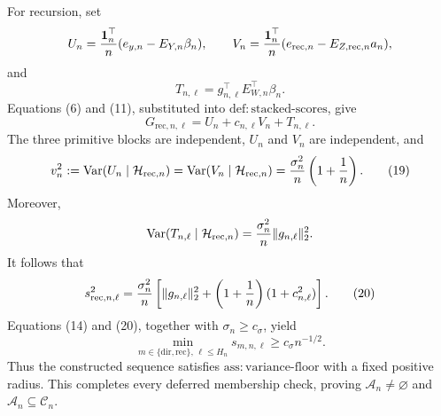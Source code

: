 For recursion, set
\[
 U_n={\boldsymbol 1_n^{\top}\over n}(e_{y,n}-E_{Y,n}\beta_n),
 \qquad
 V_n={\boldsymbol 1_n^{\top}\over n}(e_{\mathrm{rec},n}-E_{Z,\mathrm{rec},n}a_n),
\]
and
\[
 T_{n,\ell}=g_{n,\ell}^{\top}E_{W,n}^{\top}\beta_n.
\]
Equations (6) and (11), substituted into \(\mathrm{def{:}stacked\mbox{-}scores}\), give
\[
 G_{\mathrm{rec},n,\ell}=U_n+c_{n,\ell}V_n+T_{n,\ell}.
 \tag{18}
\]
The three primitive blocks are independent, \(U_n\) and \(V_n\) are independent, and
\[
 v_n^2:=\operatorname{Var}(U_n\mid\mathcal H_{\mathrm{rec},n})
 =\operatorname{Var}(V_n\mid\mathcal H_{\mathrm{rec},n})
 ={\sigma_n^2\over n}\left(1+{1\over n}\right).
 \tag{19}
\]
Moreover,
\[
 \operatorname{Var}(T_{n,\ell}\mid\mathcal H_{\mathrm{rec},n})
 ={\sigma_n^2\over n}\|g_{n,\ell}\|_2^2.
\]
It follows that
\[
 s_{\mathrm{rec},n,\ell}^2
 ={\sigma_n^2\over n}
 \left[\|g_{n,\ell}\|_2^2
   +\left(1+{1\over n}\right)(1+c_{n,\ell}^2)\right].
 \tag{20}
\]
Equations (14) and (20), together with \(\sigma_n\geq c_\sigma\), yield
\[
 \min_{m\in\{\mathrm{dir},\mathrm{rec}\},\,\ell\leq H_n}
 s_{m,n,\ell}\geq c_\sigma n^{-1/2}.
\]
Thus the constructed sequence satisfies \(\mathrm{ass{:}variance\mbox{-}floor}\) with a fixed positive radius.  This completes every deferred membership check, proving \(\mathcal A_n\neq\varnothing\) and \(\mathcal A_n\subseteq\mathcal C_n\).

